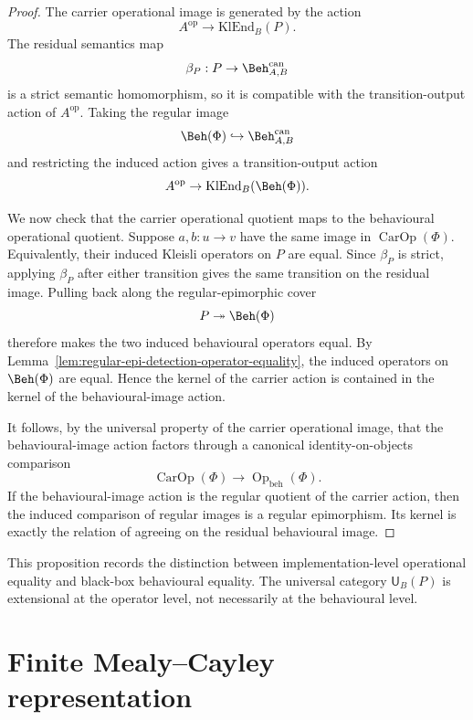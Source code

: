 \begin{proof}
The carrier operational image is generated by the action
\[
        A^{\operatorname{op}}\to\mathrm{KlEnd}_B(P).
\]
The residual semantics map
\[
        \beta_P:P\to\Beh^{\operatorname{can}}_{A,B}
\]
is a strict semantic homomorphism, so it is compatible with the transition-output action of
\(A^{\operatorname{op}}\).  Taking the regular image
\[
        \Beh(\Phi)\hookrightarrow\Beh^{\operatorname{can}}_{A,B}
\]
and restricting the induced action gives a transition-output action
\[
        A^{\operatorname{op}}\to\mathrm{KlEnd}_B(\Beh(\Phi)).
\]

We now check that the carrier operational quotient maps to the behavioural operational quotient.
Suppose \(a,b:u\to v\) have the same image in \(\operatorname{CarOp}(\Phi)\).  Equivalently, their
induced Kleisli operators on \(P\) are equal.  Since \(\beta_P\) is strict, applying \(\beta_P\)
after either transition gives the same transition on the residual image.  Pulling back along the
regular-epimorphic cover
\[
        P\twoheadrightarrow \Beh(\Phi)
\]
therefore makes the two induced behavioural operators equal.  By
Lemma~\ref{lem:regular-epi-detection-operator-equality}, the induced operators on
\(\Beh(\Phi)\) are equal.  Hence the kernel of the carrier action is contained in the kernel of
the behavioural-image action.

It follows, by the universal property of the carrier operational image, that the behavioural-image
action factors through a canonical identity-on-objects comparison
\[
        \operatorname{CarOp}(\Phi)
        \longrightarrow
        \operatorname{Op}_{\mathrm{beh}}(\Phi).
\]
If the behavioural-image action is the regular quotient of the carrier action, then the induced
comparison of regular images is a regular epimorphism.  Its kernel is exactly the relation of
agreeing on the residual behavioural image.
\end{proof}

This proposition records the distinction between implementation-level operational equality and
black-box behavioural equality.  The universal category \(\mathsf U_B(P)\) is extensional at the
operator level, not necessarily at the behavioural level.

\section{Finite Mealy--Cayley representation}
\label{sec:finite-mealy-cayley-representation}


